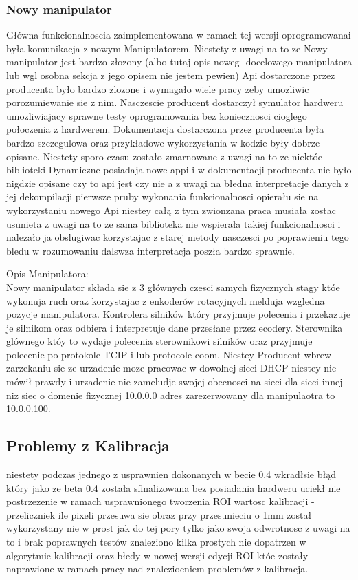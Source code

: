\documentclass[11pt,a4paper]{article}
\begin{document}
    \subsubsection{Nowy manipulator}
    \hspace{1cm} Główna funkcionalnoscia zaimplementowana w ramach tej wersji oprogramowanai była komunikacja z nowym Manipulatorem. Niestety z uwagi na to ze Nowy manipulator jest bardzo złozony (albo tutaj opis noweg- docelowego manipulatora lub wgl osobna sekcja z jego opisem nie jestem pewien) Api dostarczone przez producenta było bardzo zlozone i wymagało wiele pracy zeby umozliwic porozumiewanie sie z nim. Nasczescie producent dostarczył symulator hardweru umozliwiajacy sprawne testy oprogramowania bez koniecznosci cioglego połoczenia z hardwerem. Dokumentacja dostarczona przez producenta była bardzo szczegulowa oraz przykładowe wykorzystania w kodzie były dobrze opisane. Niestety sporo czasu zostało zmarnowane z uwagi na to ze niektóe biblioteki Dynamiczne posiadaja nowe appi i w dokumentacji producenta nie było nigdzie opisane czy to api jest czy nie a z uwagi na błedna interpretacje danych z jej dekompilacji pierwsze pruby wykonania funkcionalnosci opierału sie na wykorzystaniu nowego Api niestey całą z tym zwionzana praca musiała zostac usunieta z uwagi na to ze sama biblioteka nie wspierała takiej funkcionalnosci i nalezało ja obslugiwac korzystajac z starej metody nasczesci po poprawieniu tego bledu w rozumowaniu dalswza interpretacja poszła bardzo sprawnie.

    Opis Manipulatora:\\
    Nowy manipulator składa sie z 3 głównych czesci samych fizycznych stagy któe wykonuja ruch oraz korzystajac z enkoderów rotacyjnych melduja wzgledna pozycje manipulatora. Kontrolera silników który przyjmuje polecenia i przekazuje je silnikom oraz odbiera i interpretuje dane przesłane przez ecodery. Sterownika glównego któy to wydaje polecenia sterownikowi silników oraz przyjmuje polecenie po protokole TCIP i lub protocole coom. Niestey Producent wbrew zarzekaniu sie ze urzadenie moze pracowac w dowolnej sieci DHCP niestey nie mówił prawdy i urzadenie nie zameludje swojej obecnosci na sieci dla sieci innej niz siec o domenie fizycznej 10.0.0.0 adres zarezerwowany dla manipulaotra to 10.0.0.100.

    \subsection{Problemy z Kalibracja}
    \hspace{1cm} niestety podczas jednego z usprawnien dokonanych w becie 0.4 wkradłsie błąd który jako ze beta 0.4 została sfinalizowana bez posiadania hardweru uciekł nie postrzezenie w ramach usprawnionego tworzenia ROI wartosc kalibracji - przeliczniek ile pixeli przesuwa sie obraz przy przesunieciu o 1mm został wykorzystany nie w prost jak do tej pory tylko jako swoja odwrotnosc z uwagi na to i brak poprawnych testów znaleziono kilka prostych nie dopatrzen w algorytmie kalibracji oraz błedy w nowej wersji edycji ROI któe zostały naprawione w ramach pracy nad znalezioeniem problemów z kalibracja.
\end{document}
